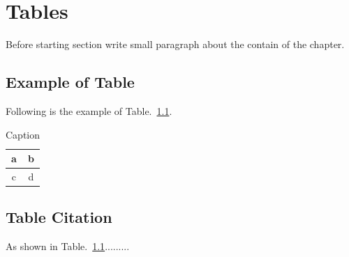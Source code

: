 %
\chapter{Tables}
Before starting section write small paragraph about the contain of the chapter.

\section{Example of Table}
Following is the example of Table.~\ref{tab:test1}.
\begin{table}[h]
    \centering
    \caption{Caption}\label{tab:test1}
    \begin{tabular}{|c|c|}
    \hline
        a & b  \\
        \hline
        c & d\\ 
    \hline    
    \end{tabular}
\end{table}
\section{Table Citation}
As shown in Table.~\ref{tab:test1}.........
